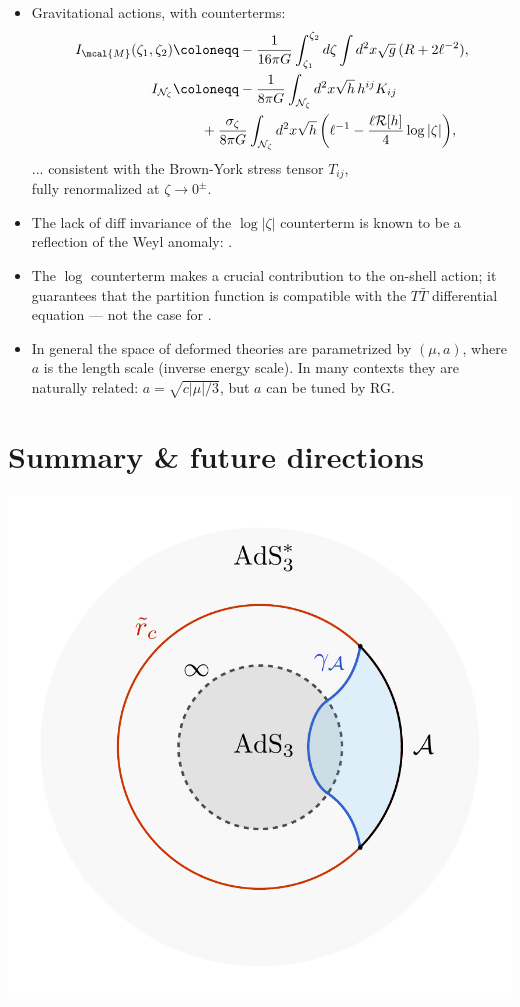 \documentclass[10pt]{article}
\begin{document}
\begin{multicols}{3}
\begin{itemize}
\item Gravitational actions, with counterterms:
	\begin{align*}
		I_{\mcal{M}}(\zeta_1, \zeta_2) & \coloneqq - \frac{1}{16\pi G} \int_{\zeta_1}^{\zeta_2} d\zeta \int d^2 x \sqrt{g} \, (R + 2 \ell^{-2}),  %
	\\
		I_{\mathcal N_{\zeta}} & \coloneqq  - \frac{1}{8\pi G} \int_{\mathcal N_{\zeta}} d^2x \sqrt{h}\,h^{ij} K_{ij} 
	\\& \qquad + \frac{\sigma_\zeta}{8\pi G} \int_{\mathcal N_{\zeta}} d^2x \sqrt{h} \, \bigg(\ell^{-1} - \frac{\ell  \mathcal{R}[h]}{4} \log |\zeta| \bigg), %
	\end{align*}
	... consistent with the Brown-York stress tensor $T_{ij}$, \\
	fully renormalized at $\zeta \to 0^\pm$. 
	
	\item The lack of diff invariance of the $\log |\zeta|$ counterterm is known to be a reflection of the Weyl anomaly: \textsl{\citeauthor{Henningson:1998gx,deHaro:2000vlm,Papadimitriou:2010as}}.

\item The $\log$ counterterm makes a crucial contribution to the on-shell action; it guarantees that the partition function is compatible with the $T\bar T$ differential equation --- not the case for \textsl{\citeauthor{Donnelly:2018bef}}.
	
	\item In general the space of deformed theories are parametrized by $(\mu,a)$, where $a$ is the length scale (inverse energy scale). In many contexts they are naturally related: $a = \sqrt{c|\mu|/3}$, but $a$ can be tuned by RG.
	
\end{itemize}


\section*{Summary \& future directions}

\begin{center}
	\includegraphics[width=.5\linewidth]{img/RT-AdS.pdf}
	

\end{center}
\end{multicols}
\end{document}
